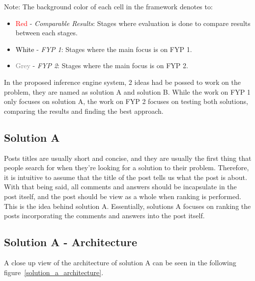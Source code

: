 \noindent Note: The background color of each cell in the framework denotes to:
\begin{itemize}
  \item \textcolor{red}{Red} - \emph{Comparable Results}: Stages where evaluation is done to compare results between each stages.
  \item \textcolor{black}{White} - \emph{FYP 1}: Stages where the main focus is on FYP 1.
  \item \textcolor{gray}{Grey} - \emph{FYP 2}: Stages where the main focus is on FYP 2.
\end{itemize}

In the proposed inference engine system, 2 ideas had be possed to work on the problem, they are named as solution A and solution B. While the work on FYP 1 only focuses on solution A, the work on FYP 2 focuses on testing both solutions, comparing the results and finding the best approach.

\subsection{Solution A}
Posts titles are usually short and concise, and they are usually the first thing that people search for when they're looking for a solution to their problem. Therefore, it is intuitive to assume that the title of the post tells us what the post is about. With that being said, all comments and answers should be incapsulate in the post itself, and the post should be view as a whole when ranking is performed. This is the idea behind solution A. Essentially, solutions A focuses on ranking the posts incorporating the comments and answers into the post itself.

\subsection{Solution A - Architecture}
A close up view of the architecture of solution A can be seen in the following figure~\ref*{solution_a_architecture}.

